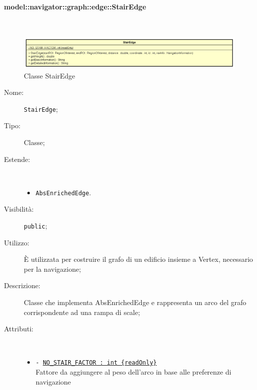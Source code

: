\documentclass[../DefinizioneDiProdotto.tex]{subfiles}
\begin{document}
\paragraph{model::navigator::graph::edge::StairEdge}
\
\begin{figure}[H]
	\centering
	\includegraphics[width=\maxwidth]{img/StairEdge.png}
	\caption{Classe StairEdge}\label{fig:model::navigator::graph::edge::StairEdge} 
\end{figure}
\begin{description}
	\item[Nome:] \texttt{StairEdge};
	\item[Tipo:] Classe;
	\item[Estende:] \
	\begin{itemize}
		\item \texttt{AbsEnrichedEdge}.
	\end{itemize}
	\item[Visibilità:] \texttt{public};
	\item[Utilizzo:] È utilizzata per costruire il grafo di un edificio insieme a Vertex, necessario per la navigazione;
	\item[Descrizione:] Classe che implementa AbsEnrichedEdge e rappresenta un arco del grafo corrispondente ad una rampa di scale;
	\item[Attributi:] \
	\begin{itemize}
		\item \texttt{- \underline{NO\_STAIR\_FACTOR : int \{readOnly\}}}\\
		Fattore da aggiungere al peso dell'arco in base alle preferenze di navigazione
		

\end{itemize}
\end{description}
\end{document}
